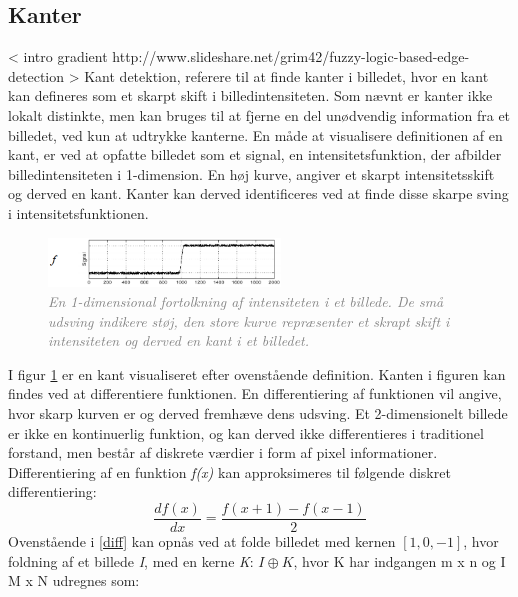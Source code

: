 \subsection{Kanter}
< intro gradient http://www.slideshare.net/grim42/fuzzy-logic-based-edge-detection >
\noindent
Kant detektion, referere til at finde kanter i billedet, hvor en kant kan defineres som et skarpt skift i billedintensiteten. Som nævnt er kanter ikke lokalt distinkte, men kan bruges til at fjerne en del unødvendig information fra et billedet, ved kun at udtrykke kanterne. 
En måde at visualisere definitionen af en kant, er ved at opfatte billedet som et signal, en intensitetsfunktion, der afbilder billedintensiteten i 1-dimension. En høj kurve, angiver et skarpt intensitetsskift og derved en kant. Kanter kan derved identificeres ved at finde disse skarpe sving i intensitetsfunktionen.
\noindent
\begin{figure}[H]
    \centering
    \includegraphics[width=0.55\textwidth]{fig/7.png}
     \vspace{-1em}
    \begin{center}        
     \caption{\textcolor{gray}{\footnotesize \textit{
     En 1-dimensional fortolkning af intensiteten i et billede. De små udsving indikere støj, den store kurve repræsenter et skrapt skift i intensiteten og derved en kant i et billedet.}}}
    \label{fig:kant}
     \end{center}
       \vspace{-2.5em}
  \end{figure}
\noindent
I figur \ref{fig:kant} er en kant visualiseret efter ovenstående definition. Kanten i figuren kan findes ved at differentiere funktionen.
En differentiering af funktionen vil angive, hvor skarp kurven er og derved fremhæve dens udsving. Et 2-dimensionelt billede er ikke en kontinuerlig funktion, og kan derved ikke differentieres i traditionel forstand, men består af diskrete værdier i form af pixel informationer.
Differentiering af en funktion \emph{f(x)} kan approksimeres til følgende diskret differentiering:
\begin{equation}
\dfrac{df(x)}{dx}=\dfrac{f(x+1)-f(x-1)}{2}
\label{diff}
\end{equation}
Ovenstående i \eqref{diff} kan opnås ved at folde billedet med kernen $[1,0,-1]$, hvor foldning af et billede \emph{I}, med en kerne \emph{K}: $I\oplus K$, hvor K har indgangen m x n og I M x N udregnes som:
